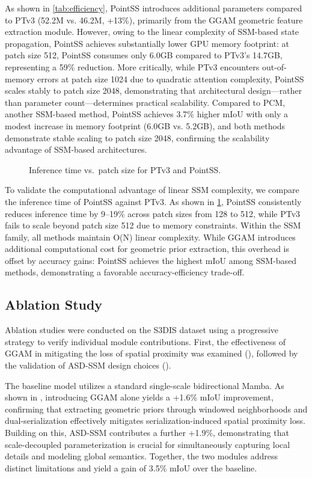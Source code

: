\documentclass[a4paper,fleqn]{cas-sc}
\begin{document}
As shown in \cref{tab:efficiency}, PointSS introduces additional parameters compared to PTv3 (52.2M vs. 46.2M, +13\%), primarily from the GGAM geometric feature extraction module. However, owing to the linear complexity of SSM-based state propagation, PointSS achieves substantially lower GPU memory footprint: at patch size 512, PointSS consumes only 6.0GB compared to PTv3's 14.7GB, representing a 59\% reduction. More critically, while PTv3 encounters out-of-memory errors at patch size 1024 due to quadratic attention complexity, PointSS scales stably to patch size 2048, demonstrating that architectural design—rather than parameter count—determines practical scalability. Compared to PCM, another SSM-based method, PointSS achieves 3.7\% higher mIoU with only a modest increase in memory footprint (6.0GB vs. 5.2GB), and both methods demonstrate stable scaling to patch size 2048, confirming the scalability advantage of SSM-based architectures.

\begin{figure}
	\centering
	\caption{Inference time vs.\ patch size for PTv3 and PointSS.}
	\label{fig:efficiency}
\end{figure}

To validate the computational advantage of linear SSM complexity, we compare the inference time of PointSS against PTv3. As shown in \cref{fig:efficiency}, PointSS consistently reduces inference time by 9--19\% across patch sizes from 128 to 512, while PTv3 fails to scale beyond patch size 512 due to memory constraints. Within the SSM family, all methods maintain O(N) linear complexity. While GGAM introduces additional computational cost for geometric prior extraction, this overhead is offset by accuracy gains: PointSS achieves the highest mIoU among SSM-based methods, demonstrating a favorable accuracy-efficiency trade-off.

\subsection{Ablation Study}

Ablation studies were conducted on the S3DIS dataset using a progressive strategy to verify individual module contributions. First, the effectiveness of GGAM in mitigating the loss of spatial proximity was examined (), followed by the validation of ASD-SSM design choices ().

The baseline model utilizes a standard single-scale bidirectional Mamba. As shown in , introducing GGAM alone yields a +1.6\% mIoU improvement, confirming that extracting geometric priors through windowed neighborhoods and dual-serialization effectively mitigates serialization-induced spatial proximity loss. Building on this, ASD-SSM contributes a further +1.9\%, demonstrating that scale-decoupled parameterization is crucial for simultaneously capturing local details and modeling global semantics. Together, the two modules address distinct limitations and yield a gain of 3.5\% mIoU over the baseline.
\end{document}
